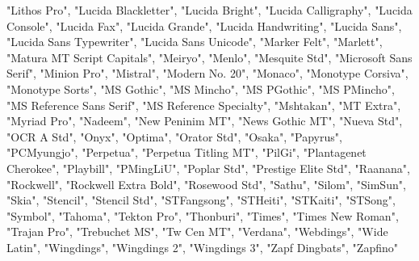 "Lithos Pro",  
"Lucida Blackletter",  
"Lucida Bright",  
"Lucida Calligraphy",  
"Lucida Console",  
"Lucida Fax",  
"Lucida Grande",  
"Lucida Handwriting",  
"Lucida Sans",  
"Lucida Sans Typewriter",  
"Lucida Sans Unicode",  
"Marker Felt",  
"Marlett",  
"Matura MT Script Capitals",  
"Meiryo",  
"Menlo",  
"Mesquite Std",  
"Microsoft Sans Serif",  
"Minion Pro",  
"Mistral",  
"Modern No. 20",  
"Monaco",  
"Monotype Corsiva",  
"Monotype Sorts",  
"MS Gothic",  
"MS Mincho",  
"MS PGothic",  
"MS PMincho",  
"MS Reference Sans Serif",  
"MS Reference Specialty",  
"Mshtakan",  
"MT Extra",  
"Myriad Pro",  
"Nadeem",  
"New Peninim MT",  
"News Gothic MT",  
"Nueva Std",  
"OCR A Std",  
"Onyx",  
"Optima",  
"Orator Std",  
"Osaka",  
"Papyrus",  
"PCMyungjo",  
"Perpetua",  
"Perpetua Titling MT",  
"PilGi",  
"Plantagenet Cherokee",  
"Playbill",  
"PMingLiU",  
"Poplar Std",  
"Prestige Elite Std",  
"Raanana",  
"Rockwell",  
"Rockwell Extra Bold",  
"Rosewood Std",  
"Sathu",  
"Silom",  
"SimSun",  
"Skia",  
"Stencil",  
"Stencil Std",  
"STFangsong",  
"STHeiti",  
"STKaiti",  
"STSong",  
"Symbol",  
"Tahoma",  
"Tekton Pro",  
"Thonburi",  
"Times",  
"Times New Roman",  
"Trajan Pro",  
"Trebuchet MS",  
"Tw Cen MT",  
"Verdana",  
"Webdings",  
"Wide Latin",  
"Wingdings",  
"Wingdings 2",  
"Wingdings 3",  
"Zapf Dingbats",  
"Zapfino"

